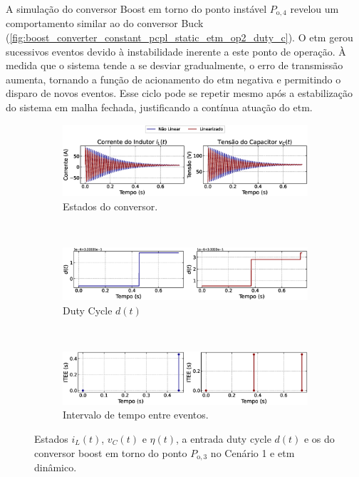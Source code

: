 A simulação do conversor Boost em torno do ponto instável $P_{\mathrm{o}, 4}$ revelou um comportamento similar ao do conversor Buck (\autoref{fig:boost_converter_constant_pcpl_static_etm_op2_duty_c}). O \acrshort{etm} gerou sucessivos eventos devido à instabilidade inerente a este ponto de operação. À medida que o sistema tende a se desviar gradualmente, o erro de transmissão aumenta, tornando a função de acionamento do \acrshort{etm}  negativa e permitindo o disparo de novos eventos. Esse ciclo pode se repetir mesmo após a estabilização do sistema em malha fechada, justificando a contínua atuação do \acrshort{etm}.

\begin{figure}[H]
  \centering
  \captionsetup{justification=centering}
  \begin{subfigure}{1.\textwidth}
    \centering
    \includegraphics[width=1.\textwidth]{figuras/dynamic-etm/boost/sim1/op1/result.eps}
    \caption{Estados do conversor.}
    \label{fig:boost_converter_constant_pcpl_dynamic_etm_op1_a}
  \end{subfigure}
  \\[6pt]
  \begin{subfigure}{1.\textwidth}
    \centering
    \includegraphics[width=1.\textwidth]{figuras/dynamic-etm/boost/sim1/op1/duty-cycle.eps}
    \caption{Duty Cycle $d(t)$}
    \label{fig:boost_converter_constant_pcpl_dynamic_etm_op1_b}
  \end{subfigure}
  \\[6pt]
  \begin{subfigure}{1.\textwidth}
    \centering
    \includegraphics[width=1.\textwidth]{figuras/dynamic-etm/boost/sim1/op1/inter-event-times.eps}
    \caption{Intervalo de tempo entre eventos.}
    \label{fig:boost_converter_constant_pcpl_dynamic_etm_op1_c}
  \end{subfigure}
  \caption{Estados $i_L(t)$, $v_C(t)$ e $\eta(t)$, a entrada duty cycle $d(t)$ e os  do conversor boost em torno do ponto $P_{\mathrm{o}, 3}$ no Cenário 1 e \acrshort{etm} dinâmico.}
  \label{fig:boost_converter_constant_pcpl_dynamic_etm_op1}
\end{figure}

